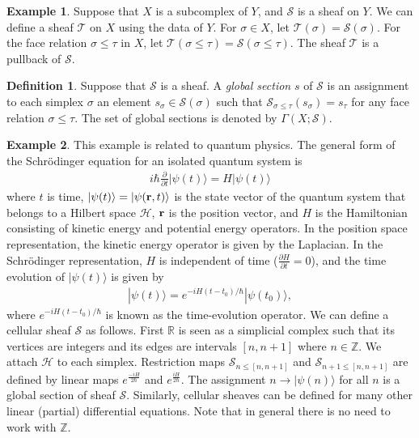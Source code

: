 \documentclass[11pt]{article}
\theoremstyle{definition}
\newtheorem{definition}{Definition}[section]
\theoremstyle{definition}
\newtheorem{example}{Example}[section]
\newcommand{\intg}{\mathbb Z}
\begin{document}
\begin{example}
    Suppose that $X$ is a subcomplex of $Y$, and $\mathscr{S}$ is a sheaf on $Y$. We can define a sheaf $\mathscr{T}$ on $X$ using the data of $Y$.
    For $\sigma \in X$, let $\mathscr{T}(\sigma) = \mathscr{S}(\sigma)$. For the face relation $\sigma \leqslant \tau$ in $X$, 
    let $\mathscr{T}(\sigma \leqslant \tau) = \mathscr{S}(\sigma \leqslant \tau)$. The sheaf $\mathscr{T}$ is a pullback of $\mathscr{S}$.
\end{example}

\begin{definition}
    Suppose that $\mathscr{S}$ is a sheaf.
    A \emph{global section} $s$ of $\mathscr{S}$ is an assignment to each simplex $\sigma$ an element $s_{\sigma} \in \mathscr{S}(\sigma)$ such that 
    $\mathscr{S}_{\sigma \leqslant \tau} (s_{\sigma}) = s_{\tau}$ for any face relation $\sigma \leqslant \tau$. 
    The set of global sections is denoted by $\Gamma(X; \mathscr{S})$.
\end{definition}

\begin{example}
    This example is related to quantum physics.
    The general form of the Schr\"odinger equation for an isolated quantum system is
    \begin{align*}
        i\hbar \frac{\partial}{\partial t} | \psi(t) \rangle = H | \psi(t) \rangle
    \end{align*}
    where $t$ is time, $| \psi(t) \rangle=| \psi({\bf r}, t) \rangle$ is the state vector of the quantum system that belongs to a Hilbert space $\mathcal{H}$, ${\bf r}$ is the position vector,     and $H$ is the Hamiltonian consisting of kinetic energy and potential energy operators. In the position space representation, the kinetic energy operator is given by the Laplacian. 
    In the Schr\"odinger representation, $H$ is independent of time ($\frac{\partial H}{\partial t}=0$), and the time evolution of $| \psi(t) \rangle$ is given by 
    \begin{align*}
        | \psi(t) \rangle = e^{-iH(t-t_0)/\hbar} | \psi(t_0) \rangle,
    \end{align*}
	where $e^{-iH(t-t_0)/\hbar} $ is known as the time-evolution operator. 
	We can define a cellular sheaf $\mathscr{S}$   as follows.
    First $\mathbb R$ is seen as a simplicial complex such that its vertices are integers and its edges are intervals $[n,n+1]$ where $n\in \mathbb Z$.
    We attach $\mathcal H$ to each simplex. Restriction maps $\mathscr{S}_{n \leqslant [n, n+1]}$ and $\mathscr{S}_{n+1 \leqslant [n,n+1]}$
    are defined by linear maps $e^{\frac{-iH }{2 \hbar}}$ and $e^{\frac{iH }{2 \hbar}}$.
    The assignment $n \to |\psi(n)\rangle$ for all $n$ is a global section of sheaf $\mathscr{S}$.   
	Similarly, cellular sheaves can be defined for many other linear (partial) differential equations. 
    Note that in general there is no need to work with $\intg$. 		
\end{example}
\end{document}
